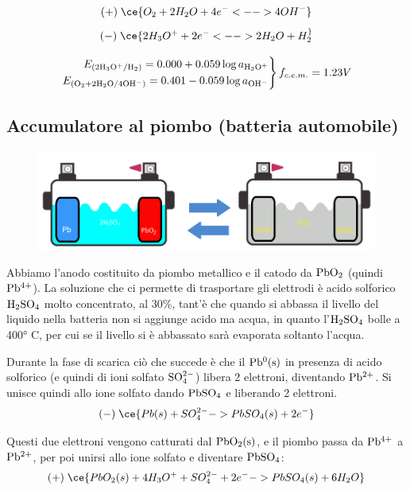 $$(+) \; \ce{O_2 + 2H_2O + 4e^- <--> 4OH^-}$$
$$(-) \; \ce{2H_3O^+ + 2e^- <--> 2H_2O + H_2 ^}$$

\begin{equation*}
    \left.\begin{aligned}
    E_{(\rm 2H_3O^+/H_2)}=0.000 + 0.059\log{a_{\rm H_3O^+}}\\
    E_{(\rm O_2 + 2H_2O/4OH^-)}=0.401 - 0.059\log{a_{\rm OH^-}}
  \end{aligned}\right\} f_{c.e.m.}=1.23 V
\end{equation*}

\subsection{Accumulatore al piombo (batteria automobile)}

\begin{figure}[H]
    \centering
    \includegraphics[width=15cm]{immagini/accumulatore_al_piombo.png}
\end{figure}

Abbiamo l'anodo costituito da piombo metallico e il catodo da $\rm PbO_2$ (quindi $\rm Pb^{4+}$). La soluzione che ci permette di trasportare gli elettrodi è acido solforico $\rm H_2SO_4$ molto concentrato, al 30\%, tant'è che quando si abbassa il livello del liquido nella batteria non si aggiunge acido ma acqua, in quanto l'$\rm H_2SO_4$ bolle a 400° C, per cui se il livello si è abbassato sarà evaporata soltanto l'acqua.

Durante la fase di scarica ciò che succede è che il $\rm Pb^0(s)$ in presenza di acido solforico (e quindi di ioni solfato $\rm SO_4^{2-}$) libera 2 elettroni, diventando $\rm Pb^{2+}$. Si unisce quindi allo ione solfato dando $\rm PbSO_4$ e liberando 2 elettroni.
$$(-)\; \ce{Pb(s) + SO_4^{2-} -> PbSO_4(s) + 2e^-}$$

Questi due elettroni vengono catturati dal $\rm PbO_2(s)$, e il piombo passa da $\rm Pb^{4+}$ a $\rm Pb^{2+}$, per poi unirsi allo ione solfato e diventare $\rm PbSO_4$:
$$(+)\; \ce{PbO_2(s) + 4H_3O^+ + SO_4^{2-} +2e^- -> PbSO_4(s) + 6H_2O}$$


